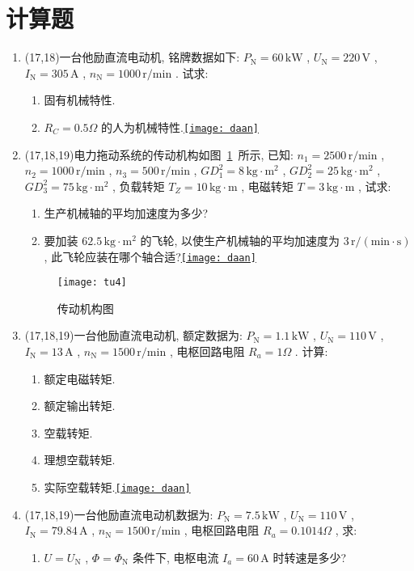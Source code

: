 \documentclass[lang=cn,11pt,marginpar=margintrue]{elegantbook}%
\newcommand{\daan}[1]{\hfill\hyperref[#1]{\texttt{[image: daan]}}}
\newcommand{\zt}[1]{\,\mathrm{#1}}
\newcommand{\NN}{\mathrm{N}}
\begin{document}
\section{计算题}
\begin{enumerate}
	\item (17,18)一台他励直流电动机, 铭牌数据如下: $P_{\NN}=60\zt{kW}$ , $U_{\NN}=220\zt{V}$ , $I_{\NN}=305\zt{A}$ , $n_{\NN}=1000\zt{r/min}$ . 试求:
		\begin{enumerate}
			\item 固有机械特性.
			\item $R_{C}=0.5\Omega$ 的人为机械特性.\daan{js:1}
		\end{enumerate}
	\item (17,18,19)电力拖动系统的传动机构如图~\ref{tu:4}~所示, 已知: $n_1=2500\zt{r/min}$ , $n_2=1000\zt{r/min}$ , $n_3=500\zt{r/min}$ , $GD_1^2=8\zt{kg\cdot m^2}$ , $GD_2^2=25\zt{kg\cdot m^2}$ , $GD_3^2=75\zt{kg\cdot m^2}$ , 负载转矩 $T_Z=10\zt{kg\cdot m}$ , 电磁转矩 $T=3\zt{kg\cdot m}$ , 试求:
		\begin{enumerate}
			\item 生产机械轴的平均加速度为多少?
			\item 要加装 $62.5\zt{kg\cdot m^2}$ 的飞轮, 以使生产机械轴的平均加速度为 $3 \zt{r/(min\cdot s)}$ , 此飞轮应装在哪个轴合适?\daan{js:2}
		\end{enumerate}
		\begin{figure}[htbp]
			\centering
			\texttt{[image: tu4]}
			\caption{传动机构图}\label{tu:4}
		\end{figure}
	\item (17,18,19)一台他励直流电动机, 额定数据为: $P_{\NN}=1.1\zt{kW}$ , $U_{\NN}=110\zt{V}$ , $I_{\NN}=13\zt{A}$ , $n_{\NN}=1500\zt{r/min}$ , 电枢回路电阻 $R_a=1\Omega$ . 计算:
		\begin{enumerate}
			\item 额定电磁转矩.
			\item 额定输出转矩.
			\item 空载转矩.
			\item 理想空载转矩.
			\item 实际空载转矩.\daan{js:3}
		\end{enumerate}
	\item (17,18,19)一台他励直流电动机数据为: $P_{\NN}=7.5\zt{kW}$ , $U_{\NN}=110\zt{V}$ , $I_{\NN}=79.84\zt{A}$ , $n_{\NN}=1500\zt{r/min}$ , 电枢回路电阻 $R_a=0.1014\Omega$ , 求:
		\begin{enumerate}
			\item $U=U_{\NN}$ , $\varPhi=\varPhi_{\NN}$ 条件下, 电枢电流 $I_a=60\zt{A}$ 时转速是多少?

\end{enumerate}
\end{enumerate}
\end{document}
